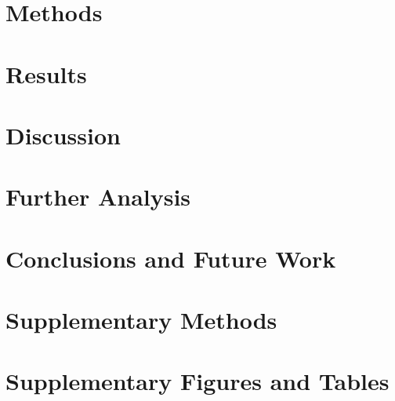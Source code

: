 \chapter{Methods}\label{ch3}


\chapter{Results}\label{ch4}


\chapter{Discussion}\label{ch5}


\chapter{Further Analysis}\label{ch6}


\chapter{Conclusions and Future Work}\label{ch7}


\backmatter

\appendix
\chapter{Supplementary Methods}\label{app:A}


\chapter{Supplementary Figures and Tables}\label{app:B}




